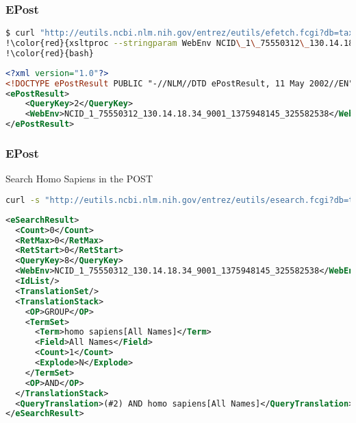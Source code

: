 \documentclass{beamer}
\begin{document}
\begin{frame}[fragile]
\frametitle{EPost}
\begin{lstlisting}[language=bash,basicstyle=\tiny,breaklines=true,escapechar=\!]
$ curl "http://eutils.ncbi.nlm.nih.gov/entrez/eutils/efetch.fcgi?db=taxonomy&!\color{red}{query\_key=1\&WebEnv=NCID\_1\_75550312\_130.14.18.34\_9001\_1375948145\_325582538}!&retmode=xml" |\
!\color{red}{xsltproc --stringparam WebEnv NCID\_1\_75550312\_130.14.18.34\_9001\_1375948145\_325582538 ncbi2epost.xsl}! - |\
!\color{red}{bash}
\end{lstlisting}

\begin{lstlisting}[language=xml,basicstyle=\tiny,breaklines=true,escapechar=\%]
<?xml version="1.0"?>
<!DOCTYPE ePostResult PUBLIC "-//NLM//DTD ePostResult, 11 May 2002//EN" "http://www.ncbi.nlm.nih.gov/entrez/query/DTD/ePost_020511.dtd">
<ePostResult>
	<QueryKey>2</QueryKey>
	<WebEnv>NCID_1_75550312_130.14.18.34_9001_1375948145_325582538</WebEnv>
</ePostResult>
\end{lstlisting}

\end{frame}

\begin{frame}[fragile]
\frametitle{EPost}
Search Homo Sapiens in the POST

\begin{lstlisting}[language=bash,basicstyle=\tiny,breaklines=true,escapechar=\!]
curl -s "http://eutils.ncbi.nlm.nih.gov/entrez/eutils/esearch.fcgi?db=taxonomy&term=!\color{red}{Homo\%20Sapiens}!&usehistory=y&WebEnv=NCID_1_75550312_130.14.18.34_9001_1375948145_325582538&query_key=2"
\end{lstlisting}

\begin{lstlisting}[language=xml,basicstyle=\tiny,breaklines=true,escapechar=\%]
<eSearchResult>
  <Count>0</Count>
  <RetMax>0</RetMax>
  <RetStart>0</RetStart>
  <QueryKey>8</QueryKey>
  <WebEnv>NCID_1_75550312_130.14.18.34_9001_1375948145_325582538</WebEnv>
  <IdList/>
  <TranslationSet/>
  <TranslationStack>
    <OP>GROUP</OP>
    <TermSet>
      <Term>homo sapiens[All Names]</Term>
      <Field>All Names</Field>
      <Count>1</Count>
      <Explode>N</Explode>
    </TermSet>
    <OP>AND</OP>
  </TranslationStack>
  <QueryTranslation>(#2) AND homo sapiens[All Names]</QueryTranslation>
</eSearchResult>
\end{lstlisting}

\end{frame}
\end{document}

